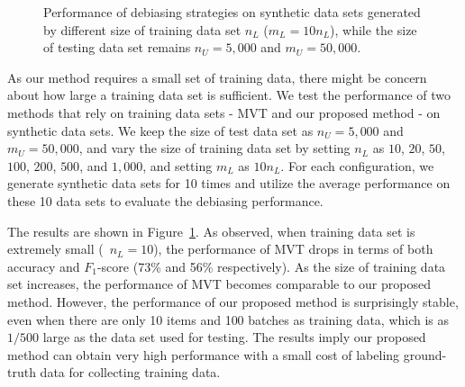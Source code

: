 \begin{figure}[!t]
  \centering
  \caption{\label{fig:trainratio}
  Performance of debiasing strategies on synthetic data sets 
  generated by different size of training data set $n_L$ ($m_L=10n_L$), 
  while the size of testing data set remains $n_U=5,000$ and $m_U=50,000$.
  }
\end{figure}

As our method requires a small set of training data, 
there might be concern about how large a training data set is sufficient.  
We test the performance of two methods that rely on training data sets - MVT and our proposed method - 
on synthetic data sets.  
We keep the size of test data set as $n_U=5,000$ and $m_U=50,000$, 
and vary the size of training data set by setting $n_L$ as $10$, $20$, $50$, $100$, $200$, $500$, and $1,000$, 
and setting $m_L$ as $10 n_L$.  
For each configuration, we generate synthetic data sets for 10 times 
and utilize the average performance on these 10 data sets to evaluate the debiasing performance.  

The results are shown in Figure~\ref{fig:trainratio}.  
As observed, when training data set is extremely small (\eg~$n_L=10$), 
the performance of MVT drops in terms of both accuracy and $F_1$-score (73\% and 56\% respectively).  
As the size of training data set increases, 
the performance of MVT becomes comparable to our proposed method.  
However, the performance of our proposed method is surprisingly stable, 
even when there are only 10 items and 100 batches as training data, 
which is as $1/500$ large as the data set used for testing.  
The results imply our proposed method can obtain very high performance 
with a small cost of labeling ground-truth data for collecting training data.  


%

